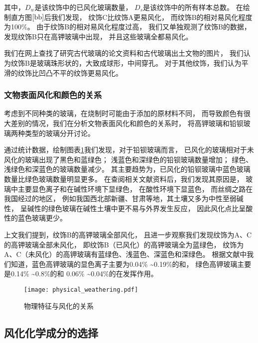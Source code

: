\documentclass[withoutpreface,bwprint]{cumcmthesis} %
\begin{document}
其中，$D_w$是该纹饰中的已风化玻璃数量，
$D_s$是该纹饰中的所有样本总数。
在绘制直方图$\ref{bb}$后我们发现，
纹饰C比纹饰A更易风化，
而纹饰B的相对易风化程度为100\%。
由于纹饰B的相对易风化程度过高，
我们又单独观测了纹饰B的数据，
发现纹饰B只在高钾玻璃中出现，
并且这些玻璃全都易风化。

我们在网上查找了研究古代玻璃的论文资料和古代玻璃出土文物的图片，
我们认为纹饰B是玻璃珠形状的，大致成球形，中间穿孔\cite{yunnanluliangxianxueguanbao}。
对于其他纹饰，我们认为平滑的纹饰比凹凸不平的纹饰更易风化\cite{zhanguojihandai}\cite{zhongguozhanhanqian}\cite{shanxilintongxinfeng}。

\subsubsection{文物表面风化和颜色的关系}

考虑到不同种类的玻璃，在烧制时可能由于添加的原材料不同，
而导致颜色有很大差别的情况，我们在分析文物表面风化和颜色的关系时，
将高钾玻璃和铅钡玻璃两种类型的玻璃分开讨论。

通过统计数据，绘制图表\ref{bb}我们发现，对于铅钡玻璃而言，
已风化的玻璃相对于未风化的玻璃出现了黑色和蓝绿色；
浅蓝色和深绿色的铅钡玻璃数量增加；
绿色、浅绿色和深蓝色的玻璃数量减少。
其主要趋势为，已风化的铅钡玻璃中蓝色玻璃数量比绿色玻璃数量明显更多。
在查阅相关文献资料后，我们发现其原因是，
玻璃中主要显色离子和在碱性环境下显绿色，
在酸性环境下显蓝色\cite{yijianzhanguoshiqibaleng}\cite{hunanyuanshuiliuyu}，
而丝绸之路在我国经过的地区，
例如我国西北部新疆、甘肃等地，其土壤又多为中性至弱碱性，
呈碱性的绿色玻璃在碱性土壤中更不易与外界发生反应，
因此风化点比呈酸性的蓝色玻璃更少。

上文我们提到，纹饰B的高钾玻璃全部风化，
且进一步观察我们发现纹饰为A、C的高钾玻璃全部未风化，
即纹饰B（已风化）的高钾玻璃全为蓝绿色，
纹饰为A、C（未风化）的高钾玻璃有蓝绿色、浅蓝色、深蓝色和深绿色。
根据文献中我们知道，蓝色高钾玻璃的显色离子主要为0.04\% \textasciitilde 0.19\%的和，
绿色高钾玻璃主要是0.14\% \textasciitilde 0.8\%的和
0.06\% \textasciitilde 0.04\%的在发挥作用\cite{wedepohl2010chemical}。


\begin{figure}[!h]
    \centering
    \texttt{[image: physical\_weathering.pdf]}
    \caption{物理特征与风化的关系}
    \label{bb}
\end{figure}


\subsection{风化化学成分的选择}
\end{document}
